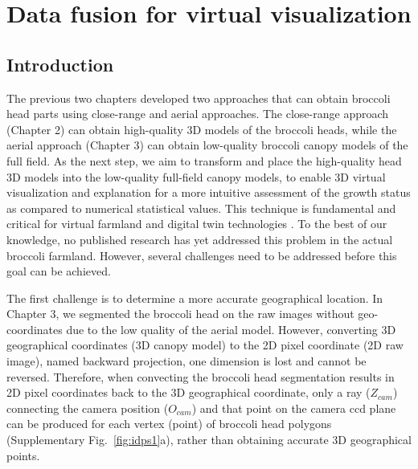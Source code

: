\chapter{Data fusion for virtual visualization}

\section{Introduction}

The previous two chapters developed two approaches that can obtain broccoli head parts using close-range and aerial approaches. The close-range approach (Chapter 2) can obtain high-quality 3D models of the broccoli heads, while the aerial approach (Chapter 3) can obtain low-quality broccoli canopy models of the full field. As the next step, we aim to transform and place the high-quality head 3D models into the low-quality full-field canopy models, to enable 3D virtual visualization and explanation for a more intuitive assessment of the growth status as compared to numerical statistical values. This technique is fundamental and critical for virtual farmland and digital twin technologies \citep{pylianidis_introducing_2021, slob_virtual_2023}. To the best of our knowledge, no published research has yet addressed this problem in the actual broccoli farmland. However, several challenges need to be addressed before this goal can be achieved.

The first challenge is to determine a more accurate geographical location. In Chapter 3, we segmented the broccoli head on the raw images without geo-coordinates due to the low quality of the aerial model. However, converting 3D geographical coordinates (3D canopy model) to the 2D pixel coordinate (2D raw image), named backward projection, one dimension is lost and cannot be reversed. Therefore, when convecting the broccoli head segmentation results in 2D pixel coordinates back to the 3D geographical coordinate, only a ray ($Z_{cam}$) connecting the camera position ($O_{cam}$) and that point on the camera \gls{ccd} plane can be produced for each vertex (point) of broccoli head polygons (Supplementary Fig.~\ref{fig:idps1}a), rather than obtaining accurate 3D geographical points.

